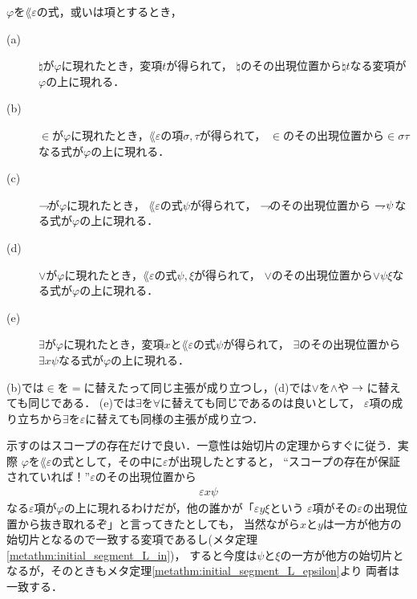 	\begin{screen}
		\begin{metathm}
		\label{metathm:existence_of_scopes_L_epsilon}
			$\varphi$を$\lang{\varepsilon}$の式，或いは項とするとき，
			\begin{description}
				\item[(a)] $\natural$が$\varphi$に現れたとき，変項$t$が得られて，
					$\natural$のその出現位置から$\natural t$なる変項が$\varphi$の上に現れる．
					
				\item[(b)] $\in$が$\varphi$に現れたとき，$\lang{\varepsilon}$の項$\sigma,\tau$が得られて，
					$\in$のその出現位置から$\in \sigma \tau$なる式が$\varphi$の上に現れる．
				
				\item[(c)] $\rightharpoondown\hspace{-0.25em}$が$\varphi$に現れたとき，
					$\lang{\varepsilon}$の式$\psi$が得られて，
					$\rightharpoondown\hspace{-0.25em}$のその出現位置から
					$\rightharpoondown\hspace{-0.25em} \psi$なる式が$\varphi$の上に現れる．
				
				\item[(d)] $\vee$が$\varphi$に現れたとき，$\lang{\varepsilon}$の式$\psi,\xi$が得られて，
					$\vee$のその出現位置から$\vee \psi \xi$なる式が$\varphi$の上に現れる．
				
				\item[(e)] $\exists$が$\varphi$に現れたとき，変項$x$と$\lang{\varepsilon}$の式$\psi$が得られて，
					$\exists$のその出現位置から$\exists x \psi$なる式が$\varphi$の上に現れる．
			\end{description}
		\end{metathm}
	\end{screen}
	
	(b)では$\in$を$=$に替えたって同じ主張が成り立つし，(d)では$\vee$を$\wedge$や$\hspace{0.25em}\rightarrow\hspace{0.25em}$に替えても同じである．
	(e)では$\exists$を$\forall$に替えても同じであるのは良いとして，
	$\varepsilon$項の成り立ちから$\exists$を$\varepsilon$に替えても同様の主張が成り立つ．
	
	示すのはスコープの存在だけで良い．一意性は始切片の定理からすぐに従う．実際
	$\varphi$を$\lang{\varepsilon}$の式として，その中に$\varepsilon$が出現したとすると，
	``スコープの存在が保証されていれば！''$\varepsilon$のその出現位置から
	\begin{align}
		\varepsilon x \psi
	\end{align}
	なる$\varepsilon$項が$\varphi$の上に現れるわけだが，他の誰かが「$\varepsilon y \xi$という
	$\varepsilon$項がその$\varepsilon$の出現位置から抜き取れるぞ」と言ってきたとしても，
	当然ながら$x$と$y$は一方が他方の始切片となるので一致する変項であるし(メタ定理\ref{metathm:initial_segment_L_in})，
	すると今度は$\psi$と$\xi$の一方が他方の始切片となるが，そのときもメタ定理\ref{metathm:initial_segment_L_epsilon}より
	両者は一致する．
	
